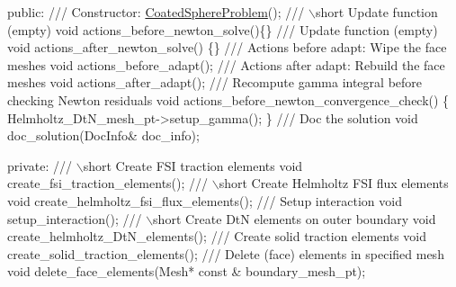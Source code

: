 \begin{DoxyCodeInclude}
\textcolor{keyword}{public}:
\textcolor{comment}{}
\textcolor{comment}{ /// Constructor:}
\textcolor{comment}{} \hyperlink{classCoatedSphereProblem}{CoatedSphereProblem}();
 \textcolor{comment}{}
\textcolor{comment}{ /// \(\backslash\)short Update function (empty)}
\textcolor{comment}{} \textcolor{keywordtype}{void} actions\_before\_newton\_solve()\{\}
\textcolor{comment}{}
\textcolor{comment}{ /// Update function (empty)}
\textcolor{comment}{} \textcolor{keywordtype}{void} actions\_after\_newton\_solve() \{\}
 \textcolor{comment}{}
\textcolor{comment}{ /// Actions before adapt: Wipe the face meshes}
\textcolor{comment}{} \textcolor{keywordtype}{void} actions\_before\_adapt();
\textcolor{comment}{}
\textcolor{comment}{ /// Actions after adapt: Rebuild the face meshes}
\textcolor{comment}{} \textcolor{keywordtype}{void} actions\_after\_adapt();
\textcolor{comment}{}
\textcolor{comment}{ /// Recompute gamma integral before checking Newton residuals}
\textcolor{comment}{} \textcolor{keywordtype}{void} actions\_before\_newton\_convergence\_check()
  \{
   Helmholtz\_DtN\_mesh\_pt->setup\_gamma();
  \}
  \textcolor{comment}{}
\textcolor{comment}{ /// Doc the solution}
\textcolor{comment}{} \textcolor{keywordtype}{void} doc\_solution(DocInfo& doc\_info);

\textcolor{keyword}{private}:
\textcolor{comment}{}
\textcolor{comment}{ /// \(\backslash\)short Create FSI traction elements}
\textcolor{comment}{} \textcolor{keywordtype}{void} create\_fsi\_traction\_elements();
\textcolor{comment}{}
\textcolor{comment}{ /// \(\backslash\)short Create Helmholtz FSI flux elements}
\textcolor{comment}{} \textcolor{keywordtype}{void} create\_helmholtz\_fsi\_flux\_elements(); 
\textcolor{comment}{}
\textcolor{comment}{ /// Setup interaction}
\textcolor{comment}{} \textcolor{keywordtype}{void} setup\_interaction();
\textcolor{comment}{}
\textcolor{comment}{ /// \(\backslash\)short Create DtN elements on outer boundary}
\textcolor{comment}{} \textcolor{keywordtype}{void} create\_helmholtz\_DtN\_elements();
\textcolor{comment}{}
\textcolor{comment}{ /// Create solid traction elements }
\textcolor{comment}{} \textcolor{keywordtype}{void} create\_solid\_traction\_elements();
\textcolor{comment}{}
\textcolor{comment}{ /// Delete (face) elements in specified mesh }
\textcolor{comment}{} \textcolor{keywordtype}{void} delete\_face\_elements(Mesh* \textcolor{keyword}{const} & boundary\_mesh\_pt);
 

\end{DoxyCodeInclude}
